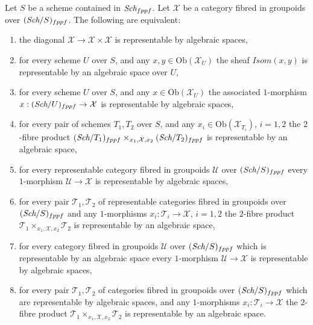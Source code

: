 \begin{lemma}
\label{lemma-representable-diagonal}
Let $S$ be a scheme contained in $\textit{Sch}_{fppf}$.
Let $\mathcal{X}$ be a category fibred in groupoids over
$(\textit{Sch}/S)_{fppf}$. The following are equivalent:
\begin{enumerate}
\item the diagonal $\mathcal{X} \to \mathcal{X} \times \mathcal{X}$
is representable by algebraic spaces,
\item for every scheme $U$ over $S$, and any
$x, y \in \text{Ob}(\mathcal{X}_U)$ the sheaf
$\mathit{Isom}(x, y)$ is representable by an algebraic space over $U$,
\item for every scheme $U$ over $S$, and any $x \in \text{Ob}(\mathcal{X}_U)$
the associated $1$-morphism $x : (\textit{Sch}/U)_{fppf} \to \mathcal{X}$
is representable by algebraic spaces,
\item for every pair of schemes $T_1, T_2$ over $S$, and any
$x_i \in \text{Ob}(\mathcal{X}_{T_i})$, $i = 1, 2$ the $2$-fibre product 
$(\textit{Sch}/T_1)_{fppf} \times_{x_1, \mathcal{X}, x_2}
(\textit{Sch}/T_2)_{fppf}$
is representable by an algebraic space,
\item for every representable category fibred in groupoids $\mathcal{U}$
over $(\textit{Sch}/S)_{fppf}$ every $1$-morphism
$\mathcal{U} \to \mathcal{X}$ is representable by algebraic spaces,
\item for every pair $\mathcal{T}_1, \mathcal{T}_2$ of representable
categories fibred in groupoids over $(\textit{Sch}/S)_{fppf}$ and any
$1$-morphisms $x_i : \mathcal{T}_i \to \mathcal{X}$, $i = 1, 2$ the
$2$-fibre product $\mathcal{T}_1 \times_{x_1, \mathcal{X}, x_2} \mathcal{T}_2$
is representable by an algebraic space,
\item for every category fibred in groupoids $\mathcal{U}$
over $(\textit{Sch}/S)_{fppf}$ which is
representable by an algebraic space every $1$-morphism
$\mathcal{U} \to \mathcal{X}$ is representable by algebraic spaces,
\item for every pair $\mathcal{T}_1, \mathcal{T}_2$ of categories fibred
in groupoids over $(\textit{Sch}/S)_{fppf}$ which are representable
by algebraic spaces, and any $1$-morphisms
$x_i : \mathcal{T}_i \to \mathcal{X}$ the
$2$-fibre product $\mathcal{T}_1 \times_{x_1, \mathcal{X}, x_2} \mathcal{T}_2$
is representable by an algebraic space.
\end{enumerate}
\end{lemma}

